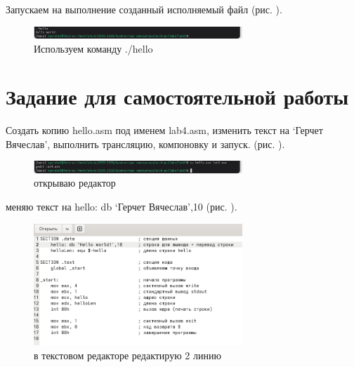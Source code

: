 \documentclass[
  12pt,
  a4paper,
  DIV=11,
  numbers=noendperiod]{scrreprt}
\begin{document}
Запускаем на выполнение созданный исполняемый файл (рис.
\textcite{fig:07}).

\begin{figure}

{\centering \includegraphics[width=0.7\textwidth,height=\textheight]{image/7.png}

}

\caption{Используем команду ./hello}

\end{figure}%

\section{Задание для самостоятельной
работы}\label{ux437ux430ux434ux430ux43dux438ux435-ux434ux43bux44f-ux441ux430ux43cux43eux441ux442ux43eux44fux442ux435ux43bux44cux43dux43eux439-ux440ux430ux431ux43eux442ux44b}

Создать копию hello.asm под именем lab4.asm, изменить текст на
\enquote*{Герчет Вячеслав}, выполнить трансляцию, компоновку и запуск.
(рис. \textcite{fig:08}).

\begin{figure}

{\centering \includegraphics[width=0.7\textwidth,height=\textheight]{image/8.png}

}

\caption{открываю редактор}

\end{figure}%

меняю текст на hello: db \enquote*{Герчет Вячеслав},10 (рис.
\textcite{fig:09}).

\begin{figure}

{\centering \includegraphics[width=0.7\textwidth,height=\textheight]{image/9.png}

}

\caption{в текстовом редакторе редактирую 2 линию}

\end{figure}%
\end{document}

